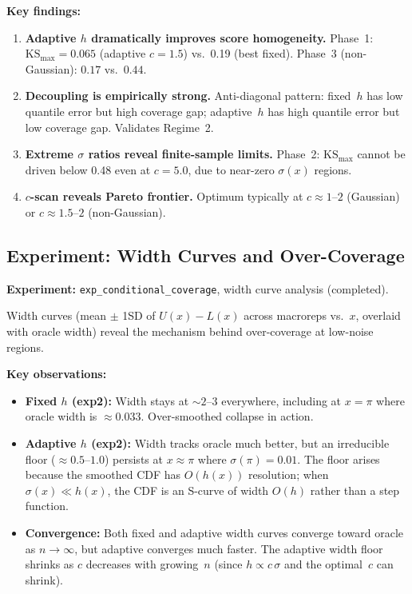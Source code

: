 \documentclass[11pt]{article}
\begin{document}
\textbf{Key findings:}
\begin{enumerate}
  \item \textbf{Adaptive $h$ dramatically improves score homogeneity.}
    Phase~1: $\mathrm{KS}_{\max} = 0.065$ (adaptive $c = 1.5$) vs.\
    0.19 (best fixed). Phase~3 (non-Gaussian): $0.17$ vs.\ $0.44$.
  \item \textbf{Decoupling is empirically strong.}
    Anti-diagonal pattern: fixed~$h$ has low quantile error but high
    coverage gap; adaptive~$h$ has high quantile error but low coverage
    gap. Validates Regime~2.
  \item \textbf{Extreme $\sigma$ ratios reveal finite-sample limits.}
    Phase~2: $\mathrm{KS}_{\max}$ cannot be driven below 0.48 even at
    $c = 5.0$, due to near-zero $\sigma(x)$ regions.
  \item \textbf{$c$-scan reveals Pareto frontier.}
    Optimum typically at $c \approx 1$--$2$ (Gaussian) or
    $c \approx 1.5$--$2$ (non-Gaussian).
\end{enumerate}

\subsection{Experiment: Width Curves and Over-Coverage}
\label{sec:exp-width}

\textbf{Experiment:} \texttt{exp\_conditional\_coverage}, width curve
analysis (completed).

Width curves (mean $\pm$ 1SD of $U(x) - L(x)$ across macroreps vs.\
$x$, overlaid with oracle width) reveal the mechanism behind
over-coverage at low-noise regions.

\textbf{Key observations:}
\begin{itemize}
  \item \textbf{Fixed $h$ (exp2):} Width stays at $\sim 2$--$3$
    everywhere, including at $x = \pi$ where oracle width is
    $\approx 0.033$. Over-smoothed collapse in action.
  \item \textbf{Adaptive $h$ (exp2):} Width tracks oracle much better,
    but an irreducible floor ($\approx 0.5$--$1.0$) persists at
    $x \approx \pi$ where $\sigma(\pi) = 0.01$. The floor arises
    because the smoothed CDF has $O(h(x))$ resolution; when
    $\sigma(x) \ll h(x)$, the CDF is an S-curve of width $O(h)$
    rather than a step function.
  \item \textbf{Convergence:} Both fixed and adaptive width curves
    converge toward oracle as $n \to \infty$, but adaptive converges
    much faster. The adaptive width floor shrinks as $c$ decreases
    with growing~$n$ (since $h \propto c\,\sigma$ and the optimal~$c$
    can shrink).
\end{itemize}
\end{document}
